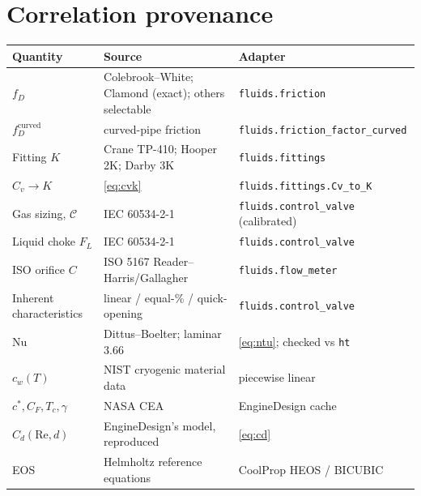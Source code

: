 \documentclass[11pt,a4paper]{article}
\newcommand{\code}[1]{\texttt{#1}}
\begin{document}
\section{Correlation provenance}
\begin{center}
\small
\begin{tabular}{lll}
\toprule
Quantity & Source & Adapter \\
\midrule
$f_D$ & Colebrook--White; Clamond (exact); others selectable & \code{fluids.friction} \\
$f_D^{\mathrm{curved}}$ & curved-pipe friction & \code{fluids.friction\_factor\_curved} \\
Fitting $K$ & Crane TP-410; Hooper 2K; Darby 3K & \code{fluids.fittings} \\
$C_v\to K$ & \cref{eq:cvk} & \code{fluids.fittings.Cv\_to\_K} \\
Gas sizing, $\mathcal{C}$ & IEC 60534-2-1 & \code{fluids.control\_valve} (calibrated) \\
Liquid choke $F_L$ & IEC 60534-2-1 & \code{fluids.control\_valve} \\
ISO orifice $C$ & ISO 5167 Reader--Harris/Gallagher & \code{fluids.flow\_meter} \\
Inherent characteristics & linear / equal-\% / quick-opening & \code{fluids.control\_valve} \\
$\mathrm{Nu}$ & Dittus--Boelter; laminar $3.66$ & \cref{eq:ntu}; checked vs \code{ht} \\
$c_w(T)$ & NIST cryogenic material data & piecewise linear \\
$c^*,C_F,T_c,\gamma$ & NASA CEA & EngineDesign cache \\
$C_d(\mathrm{Re},d)$ & EngineDesign's model, reproduced & \cref{eq:cd} \\
EOS & Helmholtz reference equations & CoolProp HEOS / BICUBIC \\
\bottomrule
\end{tabular}
\end{center}
\end{document}
